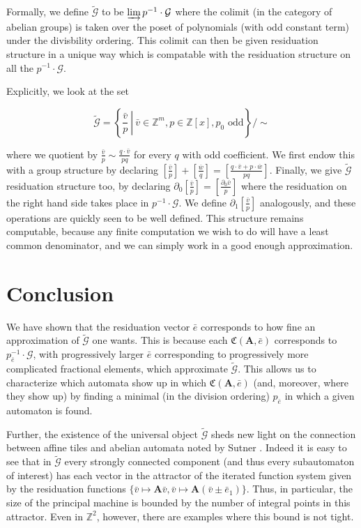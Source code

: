 \documentclass[final]{ws-ijac}
\newcommand{\G}{\mathcal{G}}
\newcommand{\C}{\mathfrak{C}(\Am,\e)}
\newcommand{\Z}{\mathbb{Z}}
\newcommand{\2}{\textbf{2}}
\newcommand{\Am}{\textbf{A}}
\newcommand{\del}{\partial}
\newcommand{\vv}{\bar{v}}
\newcommand{\e}{\bar{e}}
\begin{document}
Formally, we define $\widetilde{\G}$ to be $\varinjlim p^{-1} \cdot \G$ 
where the colimit (in the category of abelian groups) is taken over the poset 
of polynomials (with odd constant term) under the divisbility ordering. This 
colimit can then be given residuation structure in a unique way which is 
compatable with the residuation structure on all the $p^{-1} \cdot \G$.

Explicitly, we look at the set 

\[ 
  \widetilde{\G} = \left \{ \left . \frac{\vv}{p} \ \right | \  \vv \in \Z^m, p \in \Z[x], p_0 \text{ odd} \right \} / \sim
\]

where we quotient by $\frac{\vv}{p} \sim \frac{q \cdot \vv}{pq}$ for every
$q$ with odd coefficient. We first endow this with a group structure by
declaring $[\frac{\vv}{p}] + [\frac{\overline{w}}{q}] = 
[\frac{q \cdot \vv + p \cdot \overline{w}}{pq}]$. Finally, we give
$\widetilde{\G}$ residuation structure too, by declaring 
$\del_0 [\frac{\vv}{p}] = [\frac{\del_0 \vv}{p}]$ where the residuation
on the right hand side takes place in $p^{-1} \cdot \G$. We define 
$\del_1 [\frac{\vv}{p}]$ analogously, and these operations are quickly seen
to be well defined.  This structure remains computable, because any finite 
computation we wish to do will have a least common denominator, and we can
simply work in a good enough approximation.

\section{Conclusion}
We have shown that the residuation vector $\e$ corresponds to how fine an
approximation of $\widetilde{\G}$ one wants. This is because each $\C$ 
corresponds to $p_{\e}^{-1} \cdot \G$, with progressively larger $\e$ 
corresponding to progressively more complicated fractional elements, which
approximate $\widetilde{\G}$. This allows us to characterize which automata
show up in which $\C$ (and, moreover, where they show up) by finding a minimal 
(in the division ordering) $p_{\e}$ in which a given automaton is found.

Further, the existence of the universal object $\widetilde{\G}$ 
sheds new light on the connection between affine tiles
\cite{LagariasWang96:tiles,LagariasWang97:integral_tiles}
and abelian automata noted by Sutner
\cite{Sutner18:abelian_automata}. 
Indeed it is easy to see that in 
$\widetilde{\G}$ every strongly connected component 
(and thus every subautomaton of interest) has each vector in the attractor 
of the iterated function system given by the residuation functions 
$\{ \vv \mapsto \Am \vv, \vv \mapsto \Am (\vv \pm \e_1) \}$.
Thus, in particular, the size of the principal machine is bounded by the
number of integral points in this attractor. Even in $\Z^2$, however, there
are examples where this bound is not tight.
\end{document}
